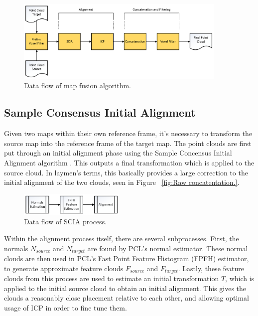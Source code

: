 \documentclass[letterpaper, oneside, 10pt]{report}
\begin{document}
\begin{figure}[h]
 \caption{Data flow of map fusion algorithm.}
 \centering
   \includegraphics[width=0.9\textwidth]{images/mapfusion}
\end{figure}

    \subsection{Sample Consensus Initial Alignment}

    \noindent Given two maps within their own reference frame, it's necessary to transform the source map into the reference frame of the target map. The point clouds are first put through an initial alignment phase using the Sample Concensus Initial Alignment algorithm \cite{rusu2009fast}. This outputs a final transformation which is applied to the source cloud. In laymen's terms, this basically provides a large correction to the initial alignment of the two clouds, seen in Figure ~\ref{fig:Raw concatentation.}.

    \begin{figure}[h]
     \caption{Data flow of SCIA process.}
     \centering
       \includegraphics[width=0.45\textwidth]{images/initialalignment}
    \end{figure}

    \noindent Within the alignment process itself, there are several subprocesses. First, the normals $N_{source}$ and $N_{target}$ are found by PCL's normal estimator. These normal clouds are then used in PCL's Fast Point Feature Histogram (FPFH) \cite{rusu2009fast,rusu2009fastlabel} estimator, to generate approximate feature clouds $F_{source}$ and $F_{target}$. Lastly, these feature clouds from this process are used to estimate an initial transformation $T$, which is applied to the initial source cloud to obtain an initial alignment. This gives the clouds a reasonably close placement relative to each other, and allowing optimal usage of ICP in order to fine tune them.
\end{document}
